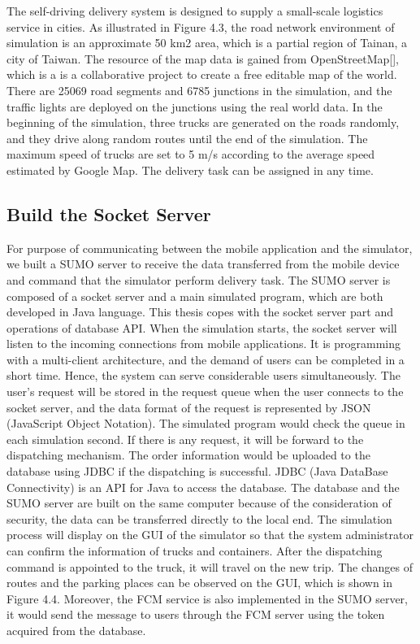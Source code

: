 \documentclass[12pt]{ksthesis}
\begin{document}
\begin{thesis}
{The self-driving delivery system is designed to supply a small-scale logistics service in cities. As illustrated in Figure 4.3, the road network environment of simulation is an approximate 50 km2 area, which is a partial region of Tainan, a city of Taiwan. The resource of the map data is gained from OpenStreetMap[], which is a is a collaborative project to create a free editable map of the world. There are 25069 road segments and 6785 junctions in the simulation, and the traffic lights are deployed on the junctions using the real world data. In the beginning of the simulation, three trucks are generated on the roads randomly, and they drive along random routes until the end of the simulation. The maximum speed of trucks are set to 5 m/s according to the average speed estimated by Google Map. The delivery task can be assigned in any time.

\subsection{Build the Socket Server}
For purpose of communicating between the mobile application and the simulator, we built a SUMO server to receive the data transferred from the mobile device and command that the simulator perform delivery task. The SUMO server is composed of a socket server and a main simulated program, which are both developed in Java language. This thesis copes with the socket server part and operations of database API.
When the simulation starts, the socket server will listen to the incoming connections from mobile applications. It is programming with a multi-client architecture, and the demand of users can be completed in a short time. Hence, the system can serve considerable users simultaneously. The user’s request will be stored in the request queue when the user connects to the socket server, and the data format of the request is represented by JSON (JavaScript Object Notation). The simulated program would check the queue in each simulation second. If there is any request, it will be forward to the dispatching mechanism. The order information would be uploaded to the database using JDBC if the dispatching is successful. JDBC (Java DataBase Connectivity) is an API for Java to access the database. The database and the SUMO server are built on the same computer because of the consideration of security, the data can be transferred directly to the local end. The simulation process will display on the GUI of the simulator so that the system administrator can confirm the information of trucks and containers. After the dispatching command is appointed to the truck, it will travel on the new trip. The changes of routes and the parking places can be observed on the GUI, which is shown in Figure 4.4. Moreover, the FCM service is also implemented in the SUMO server, it would send the message to users through the FCM server using the token acquired from the database.

}
\end{thesis}
\end{document}
